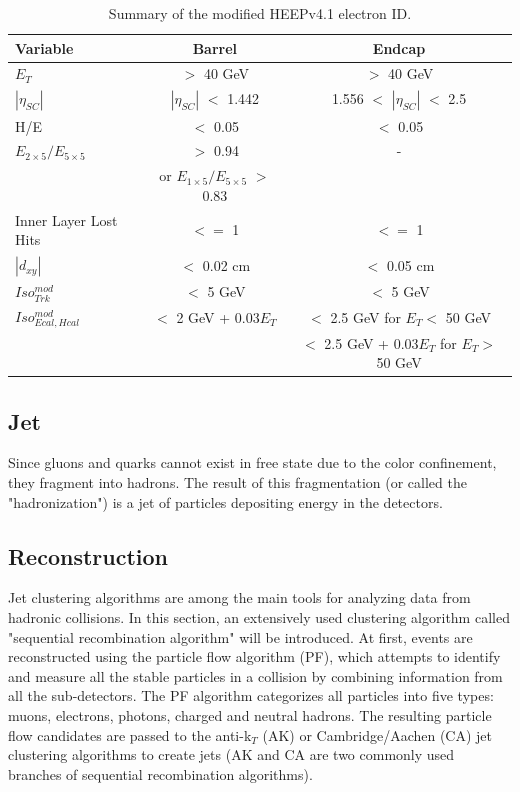 \begin{table}[hbtp]
  \begin{center}
    \begin{tabular}{|l|c|c|}
      \hline
      Variable & Barrel & Endcap \\\hline
      $E_{T}$ & $>$ 40 GeV & $>$ 40 GeV \\
      $|\eta_{SC}|$ & $|\eta_{SC}|$ $<$ 1.442 & 1.556 $<$ $|\eta_{SC}|$ $<$ 2.5 \\
      H/E & $<$ 0.05 & $<$ 0.05 \\ 
      $E_{2\times5}/E_{5\times5}$ & $>$ 0.94 & - \\
      & or $E_{1\times5}/E_{5\times5}$ $>$ 0.83 & \\ 
      Inner Layer Lost Hits & $<=$ 1 & $<=$ 1 \\
      $|d_{xy}|$ & $<$ 0.02 cm & $<$ 0.05 cm\\
      \hline
      $Iso_{Trk}^{mod}$  & $<$ 5 GeV& $<$ 5 GeV\\
      \hline
      $Iso_{Ecal, Hcal}^{mod}$  & $<$ 2 GeV + 0.03$E_{T}$ & $<$ 2.5 GeV for $E_{T} <$ 50 GeV \\
      & & $<$ 2.5 GeV + 0.03$E_{T}$ for $E_{T} >$ 50 GeV \\
      \hline
    \end{tabular}
    \caption{\label{tab:EleIDtable} Summary of the modified HEEPv4.1 electron ID.}
  \end{center}
\end{table}

\newpage
\subsection{Jet}
Since gluons and quarks cannot exist in free state due to the color confinement\cite{confinement}, they fragment into hadrons. The result of this fragmentation (or called the "hadronization") is a jet of particles depositing energy in the detectors.

\subsection*{Reconstruction}
Jet clustering algorithms are among the main tools for analyzing data from hadronic collisions. In this section, an extensively used clustering algorithm called "sequential recombination algorithm"\cite{AKalgo,CAalgo1} will be introduced. At first, events are reconstructed using the particle flow algorithm (PF)\cite{PFalgo}, which attempts to identify and measure all the stable particles in a collision by combining information from all the sub-detectors. The PF algorithm categorizes all particles into five types: muons, electrons, photons, charged and neutral hadrons. The resulting particle flow candidates are passed to the anti-k$_{T}$ (AK)\cite{AKalgo} or Cambridge/Aachen (CA)\cite{CAalgo1,CAalgo2} jet clustering algorithms to create jets (AK and CA are two commonly used branches of sequential recombination algorithms).


